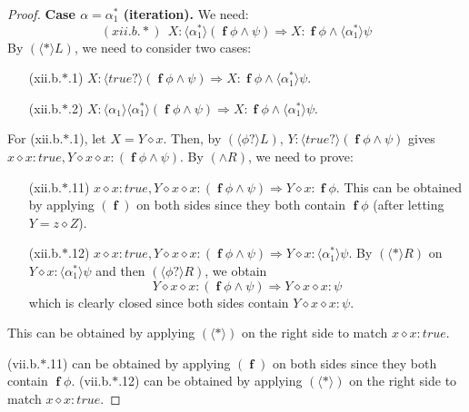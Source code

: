 \documentclass[manuscript,screen]{acmart}
\newcommand{\la}[0]{\langle}
\newcommand{\ra}[0]{\rangle}
\newcommand{\true}[0]{\mathit{true}}
\newcommand{\lup}[0]{*}
\newcommand{\cat}[0]{\diamond}
\DeclareMathOperator{\ofst}{\mathbf{f}}
\begin{document}
\begin{proof}
\textbf{Case $\alpha = \alpha_1^*$ (iteration).} We need:
$$
(xii.b.*)\ \ X : \la\alpha_1^*\ra(\ofst\phi\wedge\psi)\Rightarrow X : \ofst\phi\wedge\la\alpha_1^*\ra\psi
$$
By $(\la\lup\ra L)$, %
we need to consider two cases:
\begin{enumerate}
\item[ (xii.b.$*$.1) ] $X : \la\true?\ra(\ofst\phi\wedge\psi)\Rightarrow X : \ofst \phi\wedge \la\alpha^*_1\ra\psi$.
\item[ (xii.b.$*$.2) ] $X : \la\alpha_1\ra\la\alpha_1^*\ra(\ofst\phi\wedge\psi)\Rightarrow X : \ofst \phi\wedge \la\alpha^*_1\ra\psi$.
\end{enumerate}
For (xii.b.$*$.1), 
let $X = Y\cat x$. Then, by $(\la\phi?\ra L)$, $Y : \la\true?\ra(\ofst\phi\wedge\psi)$ gives 
$x \cat x : \true, Y\cat x\cat x : (\ofst \phi\wedge \psi)$. 
By $(\wedge R)$, we need to prove: 
\begin{enumerate}
\item[(xii.b.$*$.11)] $x \cat x : \true, Y\cat x\cat x : (\ofst \phi\wedge \psi)\Rightarrow Y\cat x : \ofst \phi$.  This can be obtained by applying $(\ofst)$ on both sides since they both contain $\ofst \phi$ (after letting $Y = z\cat Z$). 
\item[(xii.b.$*$.12)] $x \cat x : \true, Y\cat x\cat x : (\ofst \phi\wedge \psi)\Rightarrow Y\cat x : \la\alpha^*_1\ra\psi$. 
By $(\la\lup\ra R)$ on $Y\cat x : \la\alpha^*_1\ra\psi$ and then $(\la\phi?\ra R)$, we obtain 
$$
Y\cat x\cat x : (\ofst \phi\wedge \psi)\Rightarrow Y\cat x \cat x: \psi
$$
which is clearly closed since both sides contain $Y\cat x\cat x : \psi$. 
\end{enumerate}

\ifx
This can be obtained by applying $(\la\lup\ra)$ on the right side to match $x\cat x : \true$.

(vii.b.$*$.11) can be obtained by applying $(\ofst)$ on both sides since they both contain $\ofst \phi$. 
(vii.b.$*$.12) can be obtained by applying $(\la\lup\ra)$ on the right side to match $x\cat x : \true$.
\fi


\end{proof}
\end{document}
